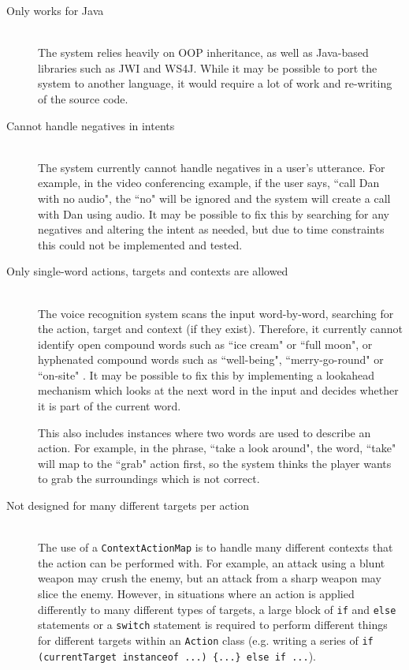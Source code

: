 \documentclass[11pt]{article}
\begin{document}
\begin{description}
\item[Only works for Java] \hfill
	\\ The system relies heavily on OOP inheritance, as well as Java-based libraries such as JWI and WS4J. While it may be possible to port the system to another language, it would require a lot of work and re-writing of the source code.
\item[Cannot handle negatives in intents] \hfill
	\\ The system currently cannot handle negatives in a user's utterance. For example, in the video conferencing example, if the user says, ``call Dan with no audio", the ``no" will be ignored and the system will create a call with Dan using audio. It may be possible to fix this by searching for any negatives and altering the intent as needed, but due to time constraints this could not be implemented and tested.
\item[Only single-word actions, targets and contexts are allowed] \hfill
	\\ The voice recognition system scans the input word-by-word, searching for the action, target and context (if they exist). Therefore, it currently cannot identify open compound words such as ``ice cream" or ``full moon", or hyphenated compound words such as ``well-being", ``merry-go-round" or ``on-site" \cite{RefWorks:129}. It may be possible to fix this by implementing a lookahead mechanism which looks at the next word in the input and decides whether it is part of the current word.
	
	This also includes instances where two words are used to describe an action. For example, in the phrase, ``take a look around", the word, ``take" will map to the ``grab" action first, so the system thinks the player wants to grab the surroundings which is not correct.
\item[Not designed for many different targets per action] \hfill
	\\ The use of a \texttt{ContextActionMap} is to handle many different contexts that the action can be performed with. For example, an attack using a blunt weapon may crush the enemy, but an attack from a sharp weapon may slice the enemy. However, in situations where an action is applied differently to many different types of targets, a large block of \texttt{if} and \texttt{else} statements or a \texttt{switch} statement is required to perform different things for different targets within an \texttt{Action} class (e.g. writing a series of \texttt{if (currentTarget instanceof ...) \{...\} else if ...}).
	

\end{description}
\end{document}
